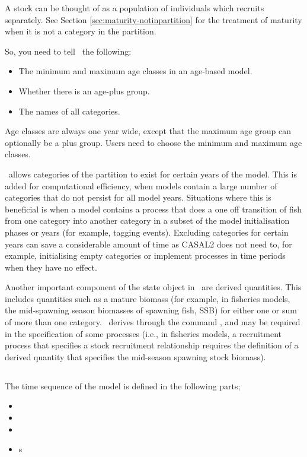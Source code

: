 A stock can be thought of as a population of individuals which recruits separately. See Section \ref{sec:maturity-notinpartition} for the treatment of maturity when it is not a category in the partition. 

So, you need to tell \CNAME\ the following: 

\begin{itemize}
\item	The minimum and maximum age classes in an age-based model.
\item	Whether there is an age-plus group.
\item The names of all categories.
\end{itemize}

Age classes are always one year wide, except that the maximum age group can optionally be a plus group. Users need to choose the minimum and maximum age classes. 

\CNAME\ allows categories of the partition to exist for certain years of the model. This is added for computational efficiency, when models contain a large number of categories that do not persist for all model years. Situations where this is beneficial is when a model contains a process that does a one off transition of fish from one category into another category in a subset of the model initialisation phases or years (for example, tagging events). Excluding categories for certain years can save a considerable amount of time as CASAL2 does not need to, for example, initialising empty categories or implement processes in time periods when they have no effect. 

Another important component of the state object in \CNAME\ are derived quantities. This includes quantities such as a mature biomass (for example, in fisheries models, the mid-spawning season biomasses of spawning fish, SSB) for either one or sum of more than one category. \CNAME\ derives through the command , and may be required in the specification of some processes (i.e., in fisheries models, a recruitment process that  specifies a stock recruitment relationship requires the definition of a derived quantity that specifies the mid-season spawning stock biomass).

\subsection{}

The time sequence of the model is defined in the following parts;
\begin{itemize}
  \item {}
  \item {}
  \item {}
  \item {}s
\end{itemize}

